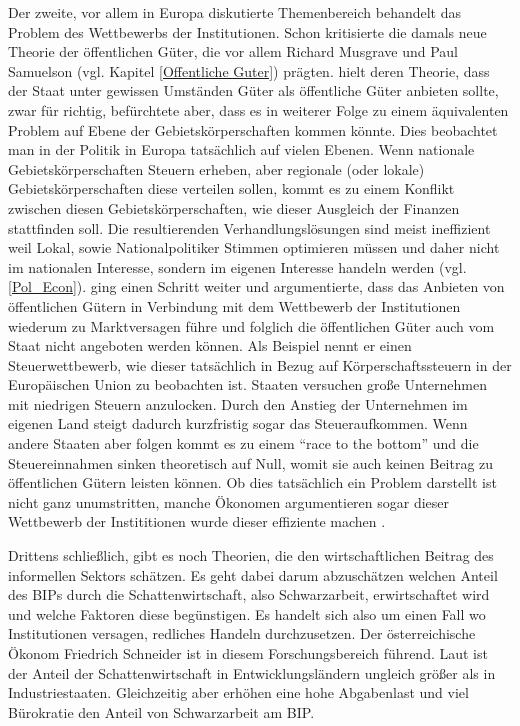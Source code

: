 Der zweite, vor allem in Europa diskutierte Themenbereich behandelt das Problem des Wettbewerbs der Institutionen. Schon \textcite{Tiebout1956} kritisierte die damals neue Theorie der öffentlichen Güter, die vor allem Richard Musgrave und Paul Samuelson (vgl. Kapitel \ref{Offentliche Guter}) prägten. \textcite{Tiebout1956} hielt deren Theorie, dass der Staat unter gewissen Umständen Güter als öffentliche Güter anbieten sollte, zwar für richtig, befürchtete aber, dass es in weiterer Folge zu einem äquivalenten Problem auf Ebene der Gebietskörperschaften kommen könnte. Dies beobachtet man in der Politik in Europa tatsächlich auf vielen Ebenen. Wenn nationale Gebietskörperschaften Steuern erheben, aber regionale (oder  lokale) Gebietskörperschaften diese verteilen sollen, kommt es zu einem Konflikt zwischen diesen Gebietskörperschaften, wie dieser Ausgleich der Finanzen stattfinden soll. Die resultierenden Verhandlungslösungen sind meist ineffizient weil Lokal, sowie Nationalpolitiker Stimmen optimieren müssen und daher nicht im nationalen Interesse, sondern im eigenen Interesse handeln werden (vgl. \ref{Pol_Econ}). \textcite{Sinn1997} ging einen Schritt weiter und argumentierte, dass das Anbieten von öffentlichen Gütern in Verbindung mit dem Wettbewerb der Institutionen wiederum zu Marktversagen führe und folglich die öffentlichen Güter auch vom Staat nicht angeboten werden können. Als Beispiel nennt er einen Steuerwettbewerb, wie dieser tatsächlich in Bezug auf Körperschaftssteuern in der Europäischen Union zu beobachten ist. Staaten versuchen große Unternehmen mit niedrigen Steuern anzulocken. Durch den Anstieg der Unternehmen im eigenen Land steigt dadurch kurzfristig sogar das Steueraufkommen. Wenn andere Staaten aber folgen kommt es zu einem "`race to the bottom"' und die Steuereinnahmen sinken theoretisch auf Null, womit sie auch keinen Beitrag zu öffentlichen Gütern leisten können. Ob dies tatsächlich ein Problem darstellt ist nicht ganz unumstritten, manche Ökonomen argumentieren sogar dieser Wettbewerb der Instititionen wurde dieser effiziente machen \parencite[S. 168f]{Voigt2009}.

Drittens schließlich, gibt es noch Theorien, die den wirtschaftlichen Beitrag des informellen Sektors schätzen. Es geht dabei darum abzuschätzen welchen Anteil des BIPs durch die Schattenwirtschaft, also Schwarzarbeit, erwirtschaftet wird und welche Faktoren diese begünstigen. Es handelt sich also um einen Fall wo Institutionen versagen, redliches Handeln durchzusetzen. Der österreichische Ökonom Friedrich Schneider ist in diesem Forschungsbereich führend. Laut \textcite{Schneider2000} ist der Anteil der Schattenwirtschaft in Entwicklungsländern ungleich größer als in Industriestaaten. Gleichzeitig aber erhöhen eine hohe Abgabenlast und viel Bürokratie  den Anteil von Schwarzarbeit am BIP.


